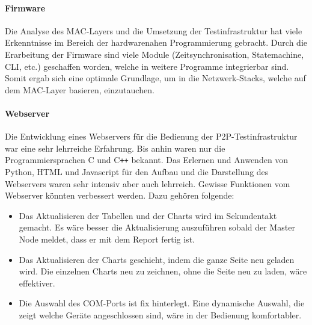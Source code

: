\paragraph{Firmware}
Die Analyse des MAC-Layers und die Umsetzung der Testinfrastruktur hat viele Erkenntnisse im Bereich der hardwarenahen Programmierung gebracht. Durch die Erarbeitung der Firmware sind viele Module (Zeitsynchronisation, Statemachine, CLI, etc.) geschaffen worden, welche in weitere Programme integrierbar sind. Somit ergab sich eine optimale Grundlage, um in die Netzwerk-Stacks, welche auf dem MAC-Layer basieren, einzutauchen.

\paragraph{Webserver}
Die Entwicklung eines Webservers für die Bedienung der P2P-Testinfrastruktur war eine sehr lehrreiche Erfahrung. Bis anhin waren nur die Programmiersprachen C und C\texttt{++} bekannt. Das Erlernen und Anwenden von Python, HTML und Javascript für den Aufbau und die Darstellung des Webservers waren sehr intensiv aber auch lehrreich. Gewisse Funktionen vom Webserver könnten verbessert werden. Dazu gehören folgende:

\begin{itemize}
	\item Das Aktualisieren der Tabellen und der Charts wird im Sekundentakt gemacht. Es wäre besser die Aktualisierung auszuführen sobald der Master Node meldet, dass er mit dem Report fertig ist.
	\item Das Aktualisieren der Charts geschieht, indem die ganze Seite neu geladen wird. Die einzelnen Charts neu zu zeichnen, ohne die Seite neu zu laden, wäre effektiver.
	\item Die Auswahl des COM-Ports ist fix hinterlegt. Eine dynamische Auswahl, die zeigt welche Geräte angeschlossen sind, wäre in der Bedienung komfortabler.
\end{itemize}


